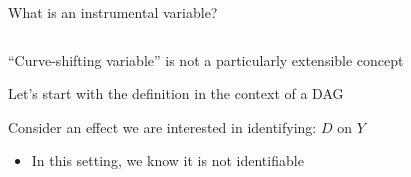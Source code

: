 \documentclass[notes,11pt, aspectratio=169]{beamer}
\newenvironment{wideitemize}{\itemize\addtolength{\itemsep}{10pt}}{\enditemize}
\begin{document}
\begin{frame}{What is an instrumental variable?}
  \begin{columns}[T] %
    \begin{column}{0.6\textwidth}
  \begin{wideitemize}
  \item ``Curve-shifting variable'' is not a particularly extensible concept
  \item Let's start with the definition in the context of a DAG
  \item Consider an effect we are interested in identifying: $D$ on $Y$
    \begin{itemize}
    \item In this setting, we know it is not identifiable
    \end{itemize}
  \end{wideitemize}
\end{column}
\begin{column}{0.4\textwidth}
  \begin{center}
      \end{center}
\end{column}
\end{columns}
\end{frame}
\end{document}
